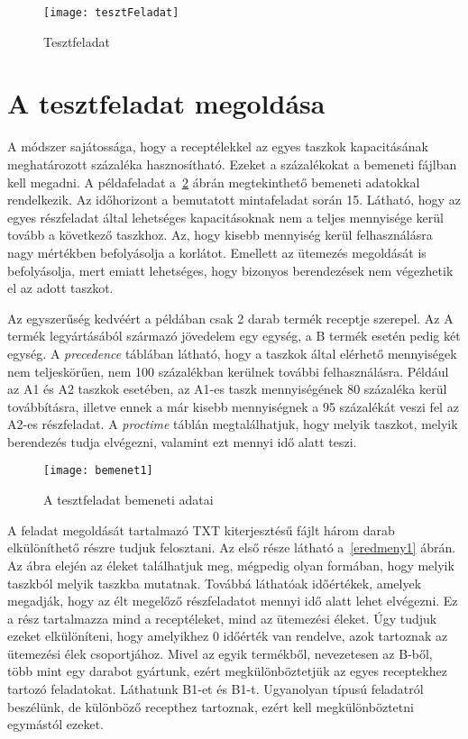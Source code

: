 \begin{figure}[H]
\begin{center}
\texttt{[image: tesztFeladat]}
\caption{Tesztfeladat}
\label{tesztFeladat}
\end{center}
\end{figure}

\section{A tesztfeladat megoldása}
A módszer sajátossága, hogy a receptélekkel az egyes taszkok kapacitásának meghatározott százaléka hasznosítható.
Ezeket a százalékokat a bemeneti fájlban kell megadni. A példafeladat a~\ref{bemenet1} ábrán megtekinthető bemeneti adatokkal rendelkezik.
Az időhorizont a bemutatott mintafeladat során 15. Látható, hogy az egyes részfeladat által lehetséges kapacitásoknak nem a teljes mennyisége kerül tovább a következő taszkhoz.
Az, hogy kisebb mennyiség kerül felhasználásra nagy mértékben befolyásolja a korlátot.
Emellett az ütemezés megoldását is befolyásolja, mert emiatt lehetséges, hogy bizonyos berendezések nem végezhetik el az adott taszkot.

Az egyszerűség kedvéért a példában csak 2 darab termék receptje szerepel.
Az A termék legyártásából származó jövedelem egy egység, a B termék esetén pedig két egység.
A \textit{precedence} táblában látható, hogy a taszkok által elérhető mennyiségek nem teljeskörűen, nem 100 százalékban kerülnek további felhasználásra.
Például az A1 és A2 taszkok esetében, az A1-es taszk mennyiségének 80 százaléka kerül továbbításra, illetve ennek a már kisebb mennyiségnek a 95 százalékát veszi fel az A2-es részfeladat.
A \textit{proctime} táblán megtalálhatjuk, hogy melyik taszkot, melyik berendezés tudja elvégezni, valamint ezt mennyi idő alatt teszi. 

\begin{figure}[H]
\begin{center}
\texttt{[image: bemenet1]}
\caption{A tesztfeladat bemeneti adatai}
\label{bemenet1}
\end{center}
\end{figure}

A feladat megoldását tartalmazó TXT kiterjesztésű fájlt három darab elkülöníthető részre tudjuk felosztani.
Az első része látható a~\ref{eredmeny1} ábrán.
Az ábra elején az éleket találhatjuk meg, mégpedig olyan formában, hogy melyik taszkból melyik taszkba mutatnak.
Továbbá láthatóak időértékek, amelyek megadják, hogy az élt megelőző részfeladatot mennyi idő alatt lehet elvégezni.
Ez a rész tartalmazza mind a receptéleket, mind az ütemezési éleket.
Úgy tudjuk ezeket elkülöníteni, hogy amelyikhez 0 időérték van rendelve, azok tartoznak az ütemezési élek csoportjához.
Mivel az egyik termékből, nevezetesen az B-ből, több mint egy darabot gyártunk, ezért megkülönböztetjük az egyes receptekhez tartozó feladatokat.
Láthatunk B1-et és B1-t.
Ugyanolyan típusú feladatról beszélünk, de különböző recepthez tartoznak, ezért kell megkülönböztetni egymástól ezeket.
 

